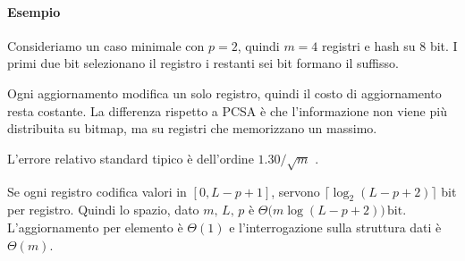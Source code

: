 \paragraph{Esempio}
Consideriamo un caso minimale con $p=2$, quindi $m=4$ registri e hash su
$8$ bit. I primi due bit selezionano il registro i restanti sei bit formano il
suffisso.

\begin{table}[htbp]
    \centering
    \small
    \setlength{\tabcolsep}{4pt}
    \renewcommand{\arraystretch}{1.1}
    \caption{Esempio operativo di LogLog}
    \label{tab:loglog-esempio}
\end{table}

Ogni aggiornamento modifica un solo registro, quindi il costo di aggiornamento
resta costante. La differenza rispetto a PCSA è che l'informazione non viene
più distribuita su bitmap, ma su registri che memorizzano un massimo.

L'errore relativo standard tipico è dell'ordine $1.30/\sqrt{m}$ \cite{Durand_Flajolet_2003}.

Se ogni registro codifica valori in $[0,L-p+1]$, servono
$\lceil\log_2(L-p+2)\rceil$ bit per registro. Quindi lo spazio, dato $m, \, L, \, p$ è
$\Theta\!\bigl(m\log(L-p+2)\bigr)\,\text{bit}$.
L'aggiornamento per elemento è $\Theta(1)$ e l'interrogazione sulla struttura dati è $\Theta(m)$.


